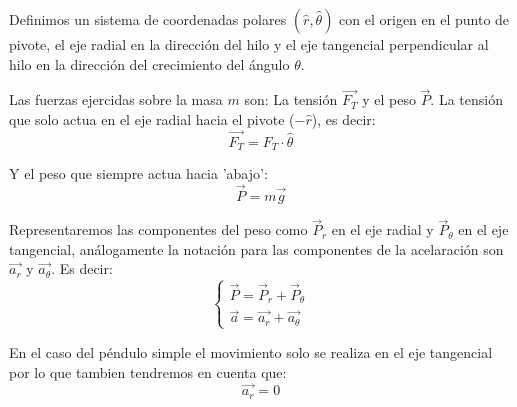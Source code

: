Definimos un sistema de coordenadas polares $(\hat{r}, \hat{\theta})$ con el origen en el punto de pivote, el eje radial en la dirección del hilo y el eje tangencial perpendicular al hilo en la dirección del crecimiento del ángulo $\theta$. 

Las fuerzas ejercidas sobre la masa $m$ son: La tensión $\vec{F_T}$ y el peso $\vec{P}$. La tensión que solo actua en el eje radial hacia el pivote ($-\hat{r}$), es decir:
\begin{equation}
    \vec{F_T}=F_T \cdot\hat{\theta}
\end{equation}

Y el peso que siempre actua hacia 'abajo':
\begin{equation}
    \vec{P}=m\vec{g}
\end{equation}


Representaremos las componentes del peso como $\vec{P}_r$ en el eje radial y $\vec{P}_{\theta}$ en el eje tangencial, análogamente la notación para las componentes de la acelaración son $\vec{a_r}$ y $\vec{a_\theta}$. Es decir:
\begin{equation}
    \begin{cases}
        \vec{P}=\vec{P}_r+\vec{P}_{\theta}\\
        \vec{a}= \vec{a_r} + \vec{a_\theta}
    \end{cases}
\end{equation}

En el caso del péndulo simple el movimiento solo se realiza en el eje tangencial por lo que tambien tendremos en cuenta que:
\begin{equation}
    \vec{a_r}=0
\end{equation}

